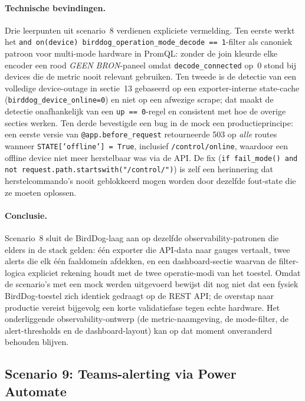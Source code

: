 \paragraph{Technische bevindingen.} Drie leerpunten uit scenario~8 verdienen expliciete vermelding. Ten eerste werkt het \texttt{and on(device) birddog\_operation\_mode\_decode == 1}-filter als canoniek patroon voor multi-mode hardware in PromQL: zonder de join kleurde elke encoder een rood \emph{GEEN BRON}-paneel omdat \texttt{decode\_connected} op~0 stond bij devices die de metric nooit relevant gebruiken. Ten tweede is de detectie van een volledige device-outage in sectie~13 gebaseerd op een exporter-interne state-cache (\texttt{birddog\_device\_online=0}) en niet op een afwezige scrape; dat maakt de detectie onafhankelijk van een \texttt{up == 0}-regel en consistent met hoe de overige secties werken. Ten derde bevestigde een bug in de mock een productieprincipe: een eerste versie van \texttt{@app.before\_request} retourneerde 503 op \emph{alle} routes wanneer \texttt{STATE[\textquoteright{}offline\textquoteright{}] = True}, inclusief \texttt{/control/online}, waardoor een offline device niet meer herstelbaar was via de API. De fix (\texttt{if fail\_mode() and not request.path.startswith("/control/")}) is zelf een herinnering dat herstelcommando's nooit geblokkeerd mogen worden door dezelfde fout-state die ze moeten oplossen.

\paragraph{Conclusie.} Scenario~8 sluit de BirdDog-laag aan op dezelfde observability-patronen die elders in de stack gelden: één exporter die API-data naar gauges vertaalt, twee alerts die elk één faaldomein afdekken, en een dashboard-sectie waarvan de filter-logica expliciet rekening houdt met de twee operatie-modi van het toestel. Omdat de scenario's met een mock werden uitgevoerd bewijst dit nog niet dat een fysiek BirdDog-toestel zich identiek gedraagt op de REST API; de overstap naar productie vereist bijgevolg een korte validatiefase tegen echte hardware. Het onderliggende observability-ontwerp (de metric-naamgeving, de mode-filter, de alert-thresholds en de dashboard-layout) kan op dat moment onveranderd behouden blijven.

\subsection{Scenario 9: Teams-alerting via Power Automate}
\label{sec:scenario-9}

